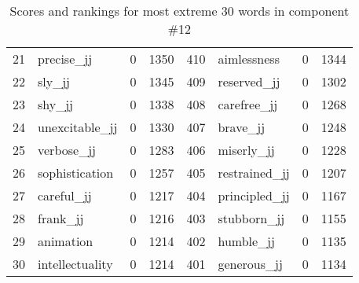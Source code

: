 \begin{table}[tbp]
\begin{tabular}{| rlr@{.}l | rlr@{.}l |}
    21 & precise\_jj & 0 & 1350    &    410 & aimlessness & 0 & 1344 \\
    22 & sly\_jj & 0 & 1345    &    409 & reserved\_jj & 0 & 1302 \\
    23 & shy\_jj & 0 & 1338    &    408 & carefree\_jj & 0 & 1268 \\
    24 & unexcitable\_jj & 0 & 1330    &    407 & brave\_jj & 0 & 1248 \\
    25 & verbose\_jj & 0 & 1283    &    406 & miserly\_jj & 0 & 1228 \\
    26 & sophistication & 0 & 1257    &    405 & restrained\_jj & 0 & 1207 \\
    27 & careful\_jj & 0 & 1217    &    404 & principled\_jj & 0 & 1167 \\
    28 & frank\_jj & 0 & 1216    &    403 & stubborn\_jj & 0 & 1155 \\
    29 & animation & 0 & 1214    &    402 & humble\_jj & 0 & 1135 \\
    30 & intellectuality & 0 & 1214    &    401 & generous\_jj & 0 & 1134 \\
    \hline
    \end{tabular}
    \caption{Scores and rankings for most extreme 30 words in component \#12} 
\end{table}
\clearpage
